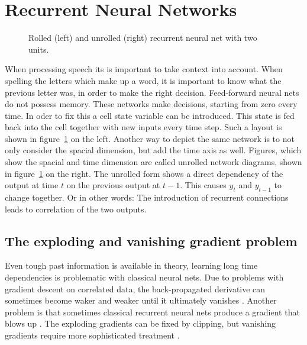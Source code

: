 \section{Recurrent Neural Networks}
\begin{figure}
\centering

\caption{Rolled (left) and unrolled (right) recurrent neural net with two units.}
\label{fig:unrolledNet}
\end{figure}
When processing speech its is important to take context into account. When spelling the letters which make up a word, it is important to know what the previous letter was, in order to make the right decision. 
Feed-forward neural nets do not possess memory. These networks make decisions, starting from zero every time. In oder to fix this a cell state variable can be introduced. This state is fed back into the cell together with new inputs every time step. Such a layout is shown in figure~\ref{fig:unrolledNet} on the left. 
Another way to depict the same network is to not only consider the spacial dimension, but add the time axis as well. Figures, which show the spacial and time dimension are called unrolled network diagrams, shown in figure~\ref{fig:unrolledNet} on the right. The unrolled form shows a direct dependency of the output at time $t$ on the previous output at $t-1$. This causes $y_t$ and $y_{t-1}$ to change together. Or in other words: The introduction of recurrent connections leads to correlation of the two outputs. 


\subsection{The exploding and vanishing gradient problem}
Even tough past information is available in theory, learning long time dependencies is problematic with classical neural nets. Due to problems with gradient descent on correlated data, the back-propagated derivative can sometimes become waker and weaker until it ultimately vanishes \cite{Hochreiter1998}. Another problem is that sometimes classical recurrent neural nets produce a gradient that blows up \cite{Pascanu2012}. The exploding gradients can be fixed by clipping, but vanishing gradients require more sophisticated treatment \cite{Bengio1993}.     

